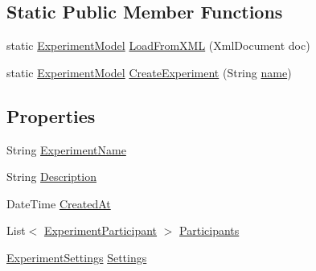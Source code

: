 \subsection*{Static Public Member Functions}
\begin{DoxyCompactItemize}
\item 
static \hyperlink{class_web_analyzer_1_1_models_1_1_base_1_1_experiment_model}{Experiment\+Model} \hyperlink{class_web_analyzer_1_1_models_1_1_base_1_1_experiment_model_a1ae79d69f4572920b709fa3f925ccf71}{Load\+From\+X\+M\+L} (Xml\+Document doc)
\item 
static \hyperlink{class_web_analyzer_1_1_models_1_1_base_1_1_experiment_model}{Experiment\+Model} \hyperlink{class_web_analyzer_1_1_models_1_1_base_1_1_experiment_model_a0e5b2b7b9b003ff62ace53c4fb2da8cf}{Create\+Experiment} (String \hyperlink{_u_i_2_h_t_m_l_resources_2js_2src_2create__experiment_8js_adac2bcb4f01b574cbc63fe8ee2c56bf0}{name})
\end{DoxyCompactItemize}
\subsection*{Properties}
\begin{DoxyCompactItemize}
\item 
String \hyperlink{class_web_analyzer_1_1_models_1_1_base_1_1_experiment_model_ac638be077683d6707e49ca4ae481a0b1}{Experiment\+Name}
\item 
String \hyperlink{class_web_analyzer_1_1_models_1_1_base_1_1_experiment_model_a3f18f9046fa10178e80e77cb433af681}{Description}
\item 
Date\+Time \hyperlink{class_web_analyzer_1_1_models_1_1_base_1_1_experiment_model_a8f50de0ba85fe31f3db2a194a66ed084}{Created\+At}
\item 
List$<$ \hyperlink{class_web_analyzer_1_1_models_1_1_base_1_1_experiment_participant}{Experiment\+Participant} $>$ \hyperlink{class_web_analyzer_1_1_models_1_1_base_1_1_experiment_model_a2429c903e1bd2b062452cfa648238380}{Participants}
\item 
\hyperlink{class_web_analyzer_1_1_models_1_1_settings_model_1_1_experiment_settings}{Experiment\+Settings} \hyperlink{class_web_analyzer_1_1_models_1_1_base_1_1_experiment_model_a00e6e2b80147ab73fc0eee0e7c20d856}{Settings}
\end{DoxyCompactItemize}
